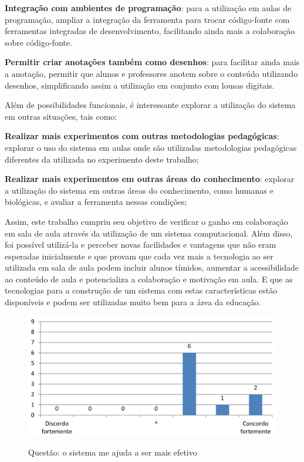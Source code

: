 \textbf{Integração com ambientes de programação}: para a utilização em aulas de programação, ampliar a integração da ferramenta para trocar código-fonte com ferramentas integradas de desenvolvimento, facilitando ainda mais a colaboração sobre código-fonte.

\textbf{Permitir criar anotações também como desenhos}: para facilitar ainda mais a anotação, permitir que alunos e professores anotem sobre o conteúdo utilizando desenhos, simplificando assim a utilização em conjunto com lousas digitais.

Além de possibilidades funcionais, é interessante explorar a utilização do sistema em outras situações, tais como:

\textbf{Realizar mais experimentos com outras metodologias pedagógicas}: explorar o uso do sistema em aulas onde são utilizadas metodologias pedagógicas diferentes da utilizada no experimento deste trabalho;

\textbf{Realizar mais experimentos em outras áreas do conhecimento}: explorar a utilização do sistema em outras áreas do conhecimento, como humanas e biológicas, e avaliar a ferramenta nessas condições;

Assim, este trabalho cumpriu seu objetivo de verificar o ganho em colaboração em sala de aula através da utilização de um sistema computacional. Além disso, foi possível utilizá-la e perceber novas facilidades e vantagens que não eram esperadas inicialmente e que provam que cada vez mais a tecnologia ao ser utilizada em sala de aula podem incluir alunos tímidos, aumentar a acessibilidade ao conteúdo de aula e potencializa a colaboração e motivação em aula. E que as tecnologias para a construção de um sistema com estas características estão disponíveis e podem ser utilizadas muito bem para a área da educação.


\iffalse
\begin{figure}[ht]
\centering
\caption{Questão: o sistema me ajuda a ser mais efetivo}
\includegraphics[width=1.0\textwidth]{use/mais_efetivo.pdf} 
\label{fig:mais_efetivo} 
\end{figure}


